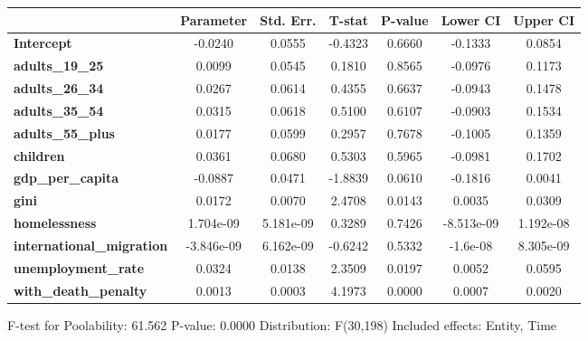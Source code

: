 \begin{center}
\begin{tabular}{lclc}
\bottomrule
\end{tabular}
\begin{tabular}{lcccccc}
                                  & \textbf{Parameter} & \textbf{Std. Err.} & \textbf{T-stat} & \textbf{P-value} & \textbf{Lower CI} & \textbf{Upper CI}  \\
\midrule
\textbf{Intercept}                &      -0.0240       &       0.0555       &     -0.4323     &      0.6660      &      -0.1333      &       0.0854       \\
\textbf{adults\_19\_25}           &       0.0099       &       0.0545       &      0.1810     &      0.8565      &      -0.0976      &       0.1173       \\
\textbf{adults\_26\_34}           &       0.0267       &       0.0614       &      0.4355     &      0.6637      &      -0.0943      &       0.1478       \\
\textbf{adults\_35\_54}           &       0.0315       &       0.0618       &      0.5100     &      0.6107      &      -0.0903      &       0.1534       \\
\textbf{adults\_55\_plus}         &       0.0177       &       0.0599       &      0.2957     &      0.7678      &      -0.1005      &       0.1359       \\
\textbf{children}                 &       0.0361       &       0.0680       &      0.5303     &      0.5965      &      -0.0981      &       0.1702       \\
\textbf{gdp\_per\_capita}         &      -0.0887       &       0.0471       &     -1.8839     &      0.0610      &      -0.1816      &       0.0041       \\
\textbf{gini}                     &       0.0172       &       0.0070       &      2.4708     &      0.0143      &       0.0035      &       0.0309       \\
\textbf{homelessness}             &     1.704e-09      &     5.181e-09      &      0.3289     &      0.7426      &     -8.513e-09    &     1.192e-08      \\
\textbf{international\_migration} &     -3.846e-09     &     6.162e-09      &     -0.6242     &      0.5332      &      -1.6e-08     &     8.305e-09      \\
\textbf{unemployment\_rate}       &       0.0324       &       0.0138       &      2.3509     &      0.0197      &       0.0052      &       0.0595       \\
\textbf{with\_death\_penalty}     &       0.0013       &       0.0003       &      4.1973     &      0.0000      &       0.0007      &       0.0020       \\
\bottomrule
\end{tabular}
\end{center}

F-test for Poolability: 61.562 \newline
 P-value: 0.0000 \newline
 Distribution: F(30,198) \newline
  \newline
 Included effects: Entity, Time